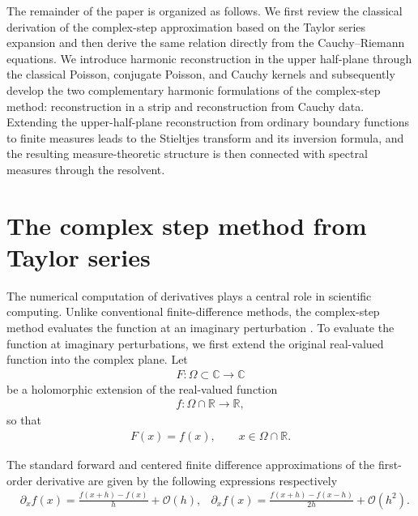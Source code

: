 \documentclass[11pt]{article}
\newcommand{\error}{\mathcal{O}}
\begin{document}
	The remainder of the paper is organized as follows. We first review the
	classical derivation of the complex-step approximation based on the
	Taylor series expansion and then derive the same relation directly from
	the Cauchy--Riemann equations. We introduce harmonic reconstruction in
	the upper half-plane through the classical Poisson, conjugate Poisson,
	and Cauchy kernels and subsequently develop the two complementary
	harmonic formulations of the complex-step method: reconstruction in a
	strip and reconstruction from Cauchy data. Extending the upper-half-plane
	reconstruction from ordinary boundary functions to finite measures leads
	to the Stieltjes transform and its inversion formula, and the resulting
	measure-theoretic structure is then connected with spectral measures
	through the resolvent.
	
	\section{The complex step method from Taylor series}
	
	The numerical computation of derivatives plays a central role in scientific computing. Unlike conventional finite-difference methods, the complex-step method evaluates the function at an imaginary perturbation \citep{Squire1998,Abreu201384}. To evaluate the function at imaginary perturbations, we first extend the original real-valued function into the complex plane. Let
	\begin{align*}
		F:\Omega\subset\mathbb C\rightarrow\mathbb C
	\end{align*}
	be a holomorphic extension of the real-valued function
\begin{align*}
	f:\Omega\cap\mathbb R\rightarrow\mathbb R,
\end{align*}
%
	so that
%
\begin{align*}
	F(x)=f(x),
	\qquad
	x\in\Omega\cap\mathbb R.
\end{align*}

	The standard forward and centered finite difference approximations of the first-order derivative are given by the following expressions respectively \citep{Thomas1995}
	\begin{align}
		& \partial_x f(x) = \frac{f(x+h) - f(x)}{h} + \error \left(h\right), & \partial_x f (x) = \frac{f(x+h) - f(x-h)}{2h} + \error \left(h^2\right).&
		\label{eq.FD_approximations}
	\end{align}
	
\end{document}
